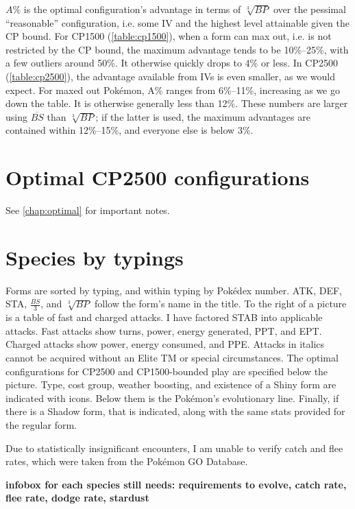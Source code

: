 \documentclass[ebook,10pt,openany,oneside]{memoir}
\begin{document}
$A\%$ is the optimal configuration's advantage in terms of $\sqrt[3]{BP}$
  over the pessimal ``reasonable'' configuration, i.e. some IV
  and the highest level attainable given the CP bound.
For CP1500 (\autoref{table:cp1500}), when a form can max out, i.e. is not restricted by the CP bound,
  the maximum advantage tends to be 10\%--25\%, with a few outliers around 50\%.
It otherwise quickly drops to 4\% or less.
In CP2500 (\autoref{table:cp2500}), the advantage available from IVs is even smaller, as we would expect.
For maxed out Pokémon, A\% ranges from 6\%--11\%, increasing as we go down the table.
It is otherwise generally less than 12\%.
These numbers are larger using $\overline{BS}$ than $\sqrt[3]{BP}$; if the latter is used,
  the maximum advantages are contained within 12\%--15\%, and everyone
  else is below 3\%.


\chapter{Optimal CP2500 configurations}
See \autoref{chap:optimal} for important notes.


\chapter{Species by typings}
\label{chap:speciesbytype}
Forms are sorted by typing, and within typing by Pokédex number.
ATK, DEF, STA, $\frac{BS}{3}$, and $\sqrt[3]{BP}$ follow the form's name in the title.
To the right of a picture is a table of fast and charged attacks.
I have factored STAB into applicable attacks.
Fast attacks show turns, power, energy generated, PPT, and EPT\@.
Charged attacks show power, energy consumed, and PPE\@.
Attacks in italics cannot be acquired without an Elite TM or special circumstances.
The optimal configurations for CP2500 and CP1500-bounded play are specified below the picture.
Type, cost group, weather boosting, and existence of a Shiny form are indicated with icons.
Below them is the Pokémon's evolutionary line.
Finally, if there is a Shadow form, that is indicated, along with the same stats
  provided for the regular form.

Due to statistically insignificant encounters, I am unable to verify catch and flee
  rates, which were taken from the Pokémon GO Database.

\textbf{infobox for each species still needs: requirements to evolve, catch rate, flee rate, dodge rate, stardust}
\clearpage

\end{document}
